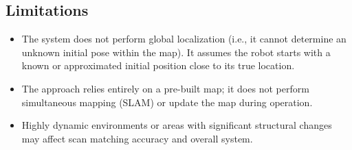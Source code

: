 \subsection{Limitations}
\begin{itemize}
	\item The system does not perform global localization (i.e., it cannot determine an unknown initial pose within the map). It assumes the robot starts with a known or approximated initial position close to its true location.
	\item The approach relies entirely on a pre-built map; it does not perform simultaneous mapping (SLAM) or update the map during operation.
	\item Highly dynamic environments or areas with significant structural changes may affect scan matching accuracy and overall system.
\end{itemize}



